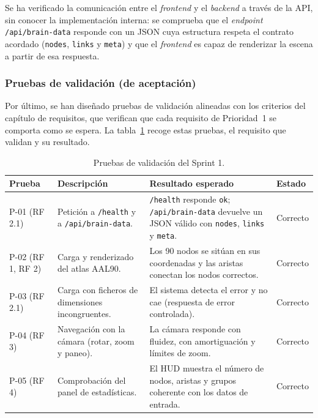 Se ha verificado la comunicación entre el \textit{frontend} y el \textit{backend} a través de la API,
sin conocer la implementación interna: se comprueba que el \textit{endpoint} \texttt{/api/brain-data}
responde con un JSON cuya estructura respeta el contrato acordado (\texttt{nodes}, \texttt{links} y
\texttt{meta}) y que el \textit{frontend} es capaz de renderizar la escena a partir de esa respuesta.

\subsubsection*{Pruebas de validación (de aceptación)}

Por último, se han diseñado pruebas de validación alineadas con los criterios del capítulo de
requisitos, que verifican que cada requisito de Prioridad~1 se comporta como se espera. La
tabla~\ref{tab:pruebas} recoge estas pruebas, el requisito que validan y su resultado.

\begin{table}[H]
	\centering
	\caption{Pruebas de validación del Sprint 1.}
	\label{tab:pruebas}
	\small
	\begin{tabularx}{\textwidth}{>{\raggedright\arraybackslash}p{1.4cm} >{\raggedright\arraybackslash}X >{\raggedright\arraybackslash}X >{\centering\arraybackslash}p{1.6cm}}
		\toprule
		\textbf{Prueba} & \textbf{Descripción} & \textbf{Resultado esperado} & \textbf{Estado} \\
		\midrule
		P-01 (RF 2.1) & Petición a \texttt{/health} y a \texttt{/api/brain-data}. &
			\texttt{/health} responde \texttt{ok}; \texttt{/api/brain-data} devuelve un JSON válido
			con \texttt{nodes}, \texttt{links} y \texttt{meta}. & Correcto \\
		\addlinespace
		P-02 (RF 1, RF 2) & Carga y renderizado del atlas AAL90. &
			Los 90 nodos se sitúan en sus coordenadas y las aristas conectan los nodos correctos. &
			Correcto \\
		\addlinespace
		P-03 (RF 2.1) & Carga con ficheros de dimensiones incongruentes. &
			El sistema detecta el error y no cae (respuesta de error controlada). & Correcto \\
		\addlinespace
		P-04 (RF 3) & Navegación con la cámara (rotar, zoom y paneo). &
			La cámara responde con fluidez, con amortiguación y límites de zoom. & Correcto \\
		\addlinespace
		P-05 (RF 4) & Comprobación del panel de estadísticas. &
			El HUD muestra el número de nodos, aristas y grupos coherente con los datos de entrada. &
			Correcto \\
		\bottomrule
	\end{tabularx}
\end{table}

